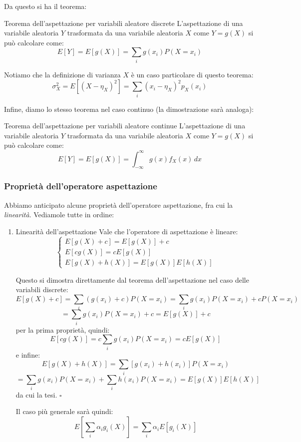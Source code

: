 \documentclass[a4paper,11pt]{article}
\begin{document}
Da questo si ha il teorema:
\begin{theorem}{Teorema dell'aspettazione per variabili aleatore discrete}
L'aspettazione di una variabile aleatoria $Y$ trasformata da una variabile aleatoria $X$ come $Y = g(X)$ si può calcolare come:
$$
E\left[Y\right] = E\left[g(X)\right] = \sum_i g(x_i) P(X = x_i)
$$
\end{theorem}

Notiamo che la definizione di varianza $X$ è un caso particolare di questo teorema:
$$
\sigma^2_X = E \left[ (X - \eta_X)^2 \right] = \sum_i (x_i - \eta_X)^2 p_X (x_i)
$$

Infine, diamo lo stesso teorema nel caso continuo (la dimostrazione sarà analoga): 
\begin{theorem}{Teorema dell'aspettazione per variabili aleatore continue}
L'aspettazione di una variabile aleatoria $Y$ trasformata da una variabile aleatoria $X$ come $Y = g(X)$ si può calcolare come:
$$
E\left[Y\right] = E\left[g(X)\right] = \int_{-\infty}^{\infty} g(x) f_X(x) \, dx 
$$
\end{theorem}

\subsubsection{Proprietà dell'operatore aspettazione}
Abbiamo anticipato alcune proprietà dell'operatore aspettazione, fra cui la \textit{linearità}. Vediamole tutte in ordine:
\begin{enumerate}
\item \begin{theorem}{Linearità dell'aspettazione}
Vale che l'operatore di aspettazione è lineare:
$$
\begin{cases}
	E\left[ g(X) + c \right] = E\left[ g(X) \right] + c \\
	E\left[ cg(X) \right] = c E\left[ g(X) \right] \\
	E\left[ g(X) + h(X) \right] = E\left[ g(X) \right] E\left[ h(X) \right]
\end{cases}
$$
\end{theorem}
Questo si dimostra direttamente dal teorema dell'aspettazione nel caso delle variabili discrete:
$$
E\left[ g(X) + c \right] = \sum_i \left( g(x_i) + c \right) P(X = x_i) = \sum_ig(x_i) P(X = x_i) + c P(X = x_i) 
$$
$$
= \sum_ig(x_i) P(X = x_i) + c = E\left[ g(X) \right] + c
$$
per la prima proprietà, quindi:
$$
E\left[cg(X)\right] = c \sum_i g(x_i) P(X = x_i) = c E \left[ g(X) \right]
$$
e infine:
$$
E \left[ g(X) + h(X) \right] = \sum_i \left[ g(x_i) + h(x_i) \right] P (X = x_i)
$$
$$
= \sum_i g(x_i) P (X = x_i) + \sum_i h(x_i) P (X = x_i) = E\left[ g(X) \right] E\left[ h(X) \right]
$$
da cui la tesi. \hfill $\square$

Il caso più generale sarà quindi:
$$
E \left[ \sum_i \alpha_i g_i (X) \right] = \sum_i \alpha_i E \left[ g_i(X) \right]
$$
\end{enumerate}
\end{document}
